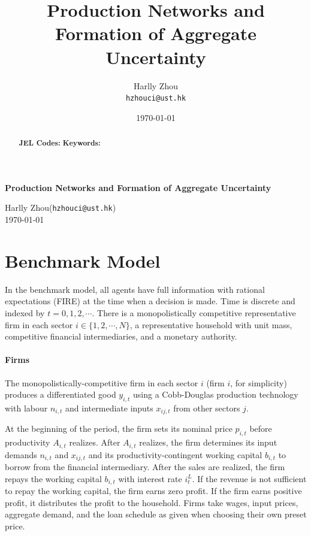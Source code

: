 \documentclass[12pt]{article}
\title{Production Networks and Formation of Aggregate Uncertainty}
\author{
Harlly Zhou\footnotemark[1]\\\texttt{hzhouci@ust.hk}
}
\date{\today}
\numberwithin{equation}{section}
\begin{document}
\begin{titlepage}
    \begin{center}
        {\LARGE\bfseries Production Networks and Formation of Aggregate Uncertainty\par}
        \vspace{1.5em}
        {\large
        Harlly Zhou\footnotemark[1] (\texttt{hzhouci@ust.hk})\\
        }
        \vspace{1em}
        \today
    \end{center}
    \vspace{2em}
    \begin{abstract}
        \sloppy
        \noindent 
         \vspace{1em}

        \noindent\textbf{JEL Codes:} 
        \noindent\textbf{Keywords:} 
        \fussy
    \end{abstract}
    \thispagestyle{empty}
    \setcounter{page}{0}
\end{titlepage}


\section{Benchmark Model}\label{sec:benchmark_model}

In the benchmark model, all agents have full information with rational expectations (FIRE) at the time when a decision is made. Time is discrete and indexed by $t=0,1,2,\cdots$. There is a monopolistically competitive representative firm in each sector $i\in\{1,2,\cdots,N\}$, a representative household with unit mass, competitive financial intermediaries, and a monetary authority.

\noindent \paragraph{Firms} The monopolistically-competitive firm in each sector $i$ (firm $i$, for simplicity) produces a differentiated good $y_{i,t}$ using a Cobb-Douglas production technology with labour $n_{i,t}$ and intermediate inputs $x_{ij,t}$ from other sectors $j$. 

At the beginning of the period, the firm sets its nominal price $p_{i,t}$ before productivity $A_{i,t}$ realizes. After $A_{i,t}$ realizes, the firm determines its input demands $n_{i,t}$ and $x_{ij,t}$ and its productivity-contingent working capital $b_{i,t}$ to borrow from the financial intermediary.  After the sales are realized, the firm repays the working capital $b_{i,t}$ with interest rate $i^L_t$. If the revenue is not sufficient to repay the working capital, the firm earns zero profit. If the firm earns positive profit, it distributes the profit to the household. Firms take wages, input prices, aggregate demand, and the loan schedule as given when choosing their own preset price.
\end{document}
